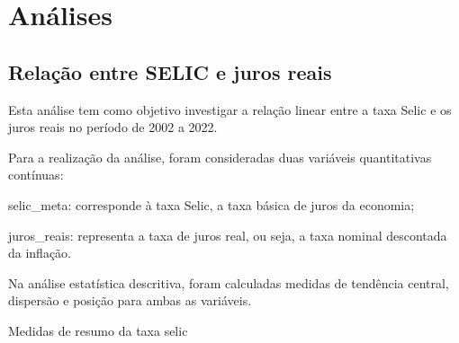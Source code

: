 \documentclass[
  portuguese,
]{estat/estat}
\let\oldsection\section
\renewcommand\section{\clearpage\oldsection}
\begin{document}
\section{Análises}\label{anuxe1lises}

\subsection{Relação entre SELIC e juros
reais}\label{relauxe7uxe3o-entre-selic-e-juros-reais}

Esta análise tem como objetivo investigar a relação linear entre a taxa
Selic e os juros reais no período de 2002 a 2022.

Para a realização da análise, foram consideradas duas variáveis
quantitativas contínuas:

selic\_meta: corresponde à taxa Selic, a taxa básica de juros da
economia;

juros\_reais: representa a taxa de juros real, ou seja, a taxa nominal
descontada da inflação.

Na análise estatística descritiva, foram calculadas medidas de tendência
central, dispersão e posição para ambas as variáveis.

\begin{quadro}[H]

\caption{\label{quad-quadro_selic}Medidas de resumo da taxa selic}


\end{quadro}%
\end{document}

